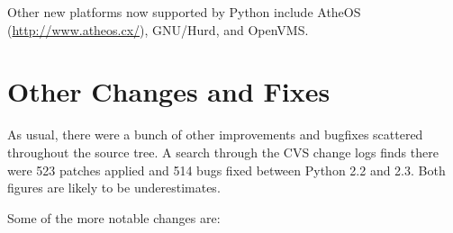 \documentclass{howto}
\begin{document}
Other new platforms now supported by Python include AtheOS
(\url{http://www.atheos.cx/}), GNU/Hurd, and OpenVMS.


\section{Other Changes and Fixes \label{section-other}}

As usual, there were a bunch of other improvements and bugfixes
scattered throughout the source tree.  A search through the CVS change
logs finds there were 523 patches applied and 514 bugs fixed between
Python 2.2 and 2.3.  Both figures are likely to be underestimates.

Some of the more notable changes are:
\end{document}
